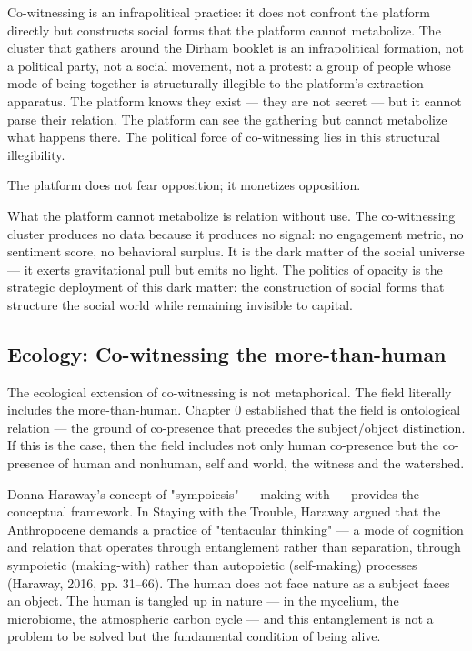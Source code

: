 Co-witnessing is an infrapolitical practice: it does not confront the platform directly but constructs social forms that the platform cannot metabolize. The cluster that gathers around the Dirham booklet is an infrapolitical formation, not a political party, not a social movement, not a protest: a group of people whose mode of being-together is structurally illegible to the platform's extraction apparatus. The platform knows they exist — they are not secret — but it cannot parse their relation. The platform can see the gathering but cannot metabolize what happens there. The political force of co-witnessing lies in this structural illegibility.

The platform does not fear opposition; it monetizes opposition.

What the platform cannot metabolize is relation without use. The co-witnessing cluster produces no data because it produces no signal: no engagement metric, no sentiment score, no behavioral surplus. It is the dark matter of the social universe — it exerts gravitational pull but emits no light. The politics of opacity is the strategic deployment of this dark matter: the construction of social forms that structure the social world while remaining invisible to capital.

\subsection{Ecology: Co-witnessing the more-than-human}

The ecological extension of co-witnessing is not metaphorical. The field literally includes the more-than-human. Chapter 0 established that the field is ontological relation — the ground of co-presence that precedes the subject/object distinction. If this is the case, then the field includes not only human co-presence but the co-presence of human and nonhuman, self and world, the witness and the watershed.

Donna Haraway's concept of "sympoiesis" — making-with — provides the conceptual framework. In Staying with the Trouble, Haraway argued that the Anthropocene demands a practice of "tentacular thinking" — a mode of cognition and relation that operates through entanglement rather than separation, through sympoietic (making-with) rather than autopoietic (self-making) processes (Haraway, 2016, pp. 31–66). The human does not face nature as a subject faces an object. The human is tangled up in nature — in the mycelium, the microbiome, the atmospheric carbon cycle — and this entanglement is not a problem to be solved but the fundamental condition of being alive.

